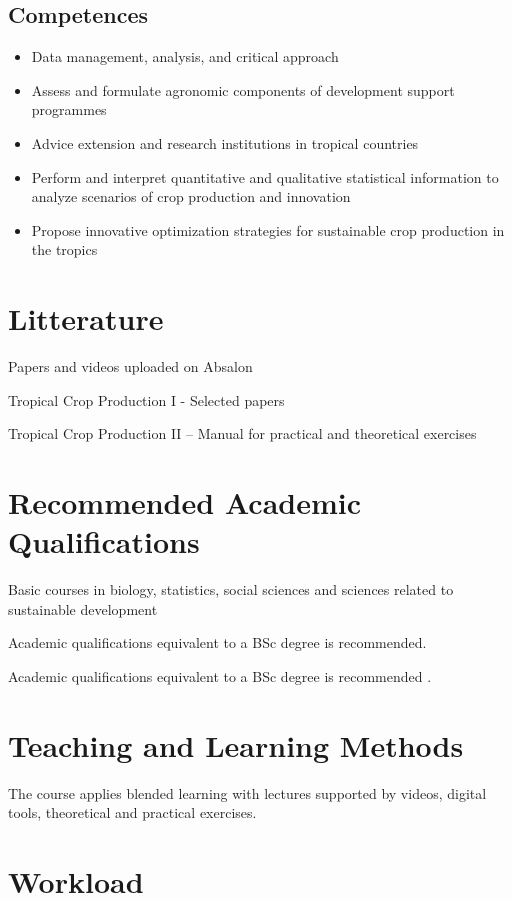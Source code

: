 \subsection*{Competences}

\begin{itemize}
    \item Data management, analysis, and critical approach
    \item Assess and formulate agronomic components of development support programmes
    \item Advice extension and research institutions in tropical countries
    \item Perform and interpret quantitative and qualitative statistical information to analyze scenarios of crop production and innovation
    \item Propose innovative optimization strategies for sustainable crop production in the tropics
\end{itemize}


\section*{Litterature}
Papers and videos uploaded on Absalon

Tropical Crop Production I - Selected papers

Tropical Crop Production II – Manual for practical and theoretical exercises

\section*{Recommended Academic Qualifications}
Basic courses in biology, statistics, social sciences and sciences related to sustainable development

Academic qualifications equivalent to a BSc degree is recommended.

Academic qualifications equivalent to a BSc degree is recommended .


\section*{Teaching and Learning Methods}
The course applies blended learning with lectures supported by videos, digital tools, theoretical and practical exercises.

\section*{Workload}

